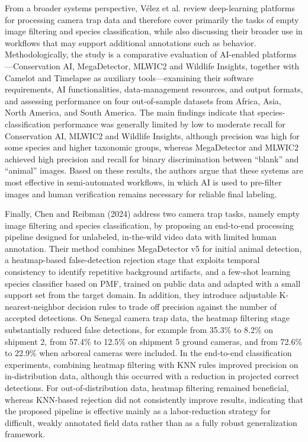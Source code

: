 From a broader systems perspective, Vélez et al. \cite{velez2023evaluation} review deep-learning platforms for processing camera trap data and therefore cover primarily the tasks of empty image filtering and species classification, while also discussing their broader use in workflows that may support additional annotations such as behavior. Methodologically, the study is a comparative evaluation of AI-enabled platforms—Conservation AI, MegaDetector, MLWIC2 and Wildlife Insights, together with Camelot and Timelapse as auxiliary tools—examining their software requirements, AI functionalities, data-management resources, and output formats, and assessing performance on four out-of-sample datasets from Africa, Asia, North America, and South America. The main findings indicate that species-classification performance was generally limited by low to moderate recall for Conservation AI, MLWIC2 and Wildlife Insights, although precision was high for some species and higher taxonomic groups, whereas MegaDetector and MLWIC2 achieved high precision and recall for binary discrimination between “blank” and “animal” images. Based on these results, the authors argue that these systems are most effective in semi-automated workflows, in which AI is used to pre-filter images and human verification remains necessary for reliable final labeling.

Finally, Chen and Reibman (2024) \cite{chen2024minimizing} address two camera trap tasks, namely empty image filtering and species classification, by proposing an end-to-end processing pipeline designed for unlabeled, in-the-wild video data with limited human annotation. Their method combines MegaDetector v5 for initial animal detection, a heatmap-based false-detection rejection stage that exploits temporal consistency to identify repetitive background artifacts, and a few-shot learning species classifier based on PMF, trained on public data and adapted with a small support set from the target domain. In addition, they introduce adjustable K-nearest-neighbor decision rules to trade off precision against the number of accepted detections. On Senegal camera trap data, the heatmap filtering stage substantially reduced false detections, for example from 35.3\% to 8.2\% on shipment 2, from 57.4\% to 12.5\% on shipment 5 ground cameras, and from 72.6\% to 22.9\% when arboreal cameras were included. In the end-to-end classification experiments, combining heatmap filtering with KNN rules improved precision on in-distribution data, although this occurred with a reduction in projected correct detections. For out-of-distribution data, heatmap filtering remained beneficial, whereas KNN-based rejection did not consistently improve results, indicating that the proposed pipeline is effective mainly as a labor-reduction strategy for difficult, weakly annotated field data rather than as a fully robust generalization framework.

